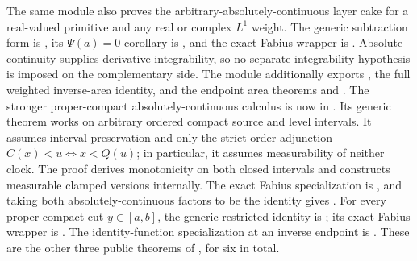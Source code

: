 \documentclass[11pt,oneside]{article}
\theoremstyle{definition}
\theoremstyle{remark}
\newcommand{\1}{\mathbf 1}
\begin{document}
\begin{statusbox}
The same module also proves the arbitrary-absolutely-continuous layer cake for a
real-valued primitive and any real or complex \(L^1\) weight.  The generic subtraction
form is
,
its \(\Psi(a)=0\) corollary is
,
and the exact Fabius wrapper is
.
Absolute continuity supplies derivative integrability, so no separate integrability
hypothesis is imposed on the complementary side.  The module additionally exports
, the full weighted inverse-area identity,
and the endpoint area theorems
 and
.
The stronger proper-compact absolutely-continuous calculus is now in
.  Its generic theorem
works on arbitrary ordered compact source and level intervals.  It assumes interval
preservation and only the strict-order adjunction
\(C(x)<u\Longleftrightarrow x<Q(u)\); in particular, it assumes measurability of neither
clock.  The proof derives monotonicity on both closed intervals and constructs measurable
clamped  versions internally.  The exact Fabius specialization is
, and taking
both absolutely-continuous factors to be the identity gives
.
For every proper compact cut \(y\in[a,b]\), the generic restricted identity is
;
its exact Fabius wrapper is
.
The identity-function specialization at an inverse endpoint is
.
These are the other three public theorems of , for six in
total.


\end{statusbox}
\end{document}
